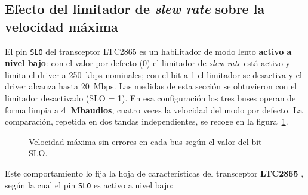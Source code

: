 \subsection{Efecto del limitador de \textit{slew rate} sobre la velocidad máxima} \label{sec:pcb_slo}

El pin \texttt{SLO} del transceptor LTC2865 es un habilitador de modo lento \textbf{activo a nivel
bajo}: con el valor por defecto (0) el limitador de \textit{slew rate} está activo y limita el
driver a 250~kbps nominales; con el bit a 1 el limitador se desactiva y el driver alcanza hasta
20~Mbps. Las medidas de esta sección se obtuvieron con el limitador desactivado (SLO = 1). En esa
configuración los tres buses operan de forma limpia a \textbf{4~Mbaudios}, cuatro veces la velocidad del
modo por defecto. La comparación, repetida en dos tandas independientes, se recoge en la
figura~\ref{fig:pcb_slo}.

\begin{figure}[htbp]
    \centering
    \caption{Velocidad máxima sin errores en cada bus según el valor del bit SLO.}
    \label{fig:pcb_slo}
\end{figure}

Este comportamiento lo fija la hoja de características del transceptor \textbf{LTC2865}
\cite{ltc2865}, según la cual el pin \texttt{SLO} es activo a nivel bajo:

